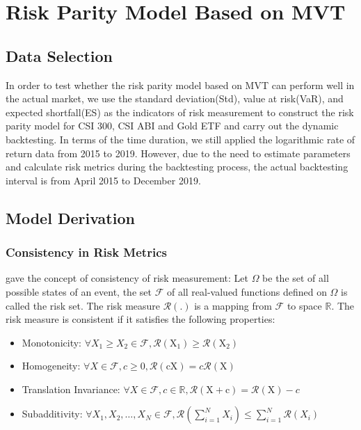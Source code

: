 \section{Risk Parity Model Based on MVT}
\subsection{Data Selection}
In order to test whether the risk parity model based on MVT can perform well in the actual market, we use the standard deviation(Std), value at risk(VaR), and expected shortfall(ES) as the indicators of risk measurement to construct the risk parity model for CSI 300, CSI ABI and Gold ETF and carry out the dynamic backtesting. In terms of the time duration, we still applied the logarithmic rate of return data from 2015 to 2019. However, due to the need to estimate parameters and calculate risk metrics during the backtesting process, the actual backtesting interval is from April 2015 to December 2019.

\subsection{Model Derivation}
\subsubsection{Consistency in Risk Metrics}
\cite{AP1999Coherentmeasures} gave the concept of consistency of risk measurement: Let $\Omega$ be the set of all possible states of an event, the set $\mathcal{F}$ of all real-valued functions defined on $\Omega$ is called the risk set. The risk measure $\boldsymbol{\mathcal{R}}(.)$ is a mapping from $\mathcal{F}$ to space $\mathbb{R}$. The risk measure is consistent if it satisfies the following properties: 
\begin{itemize}
  \item Monotonicity: $\forall X_1 \geq X_2 \in \mathcal{F}, \mathcal{R}\left(\mathrm{X}_1\right) \geq \mathcal{R}\left(\mathrm{X}_2\right)$ 
  \item Homogeneity: $\forall X \in \mathcal{F}, c \geq 0, \mathcal{R}(\mathrm{cX})=c \mathcal{R}(\mathrm{X})$
  \item Translation Invariance: $\forall X \in \mathcal{F}, c \in \mathbb{R}, \mathcal{R}(\mathrm{X}+\mathrm{c})=\mathcal{R}(\mathrm{X})-c$ 
  \item Subadditivity: $\forall X_1, X_2, \ldots, X_N \in \mathcal{F}, \mathcal{R}\left( \sum_{i=1}^{N} X_i\right) \leq \sum_{i=1}^{N} \mathcal{R}\left(X_i\right)$
\end{itemize}

